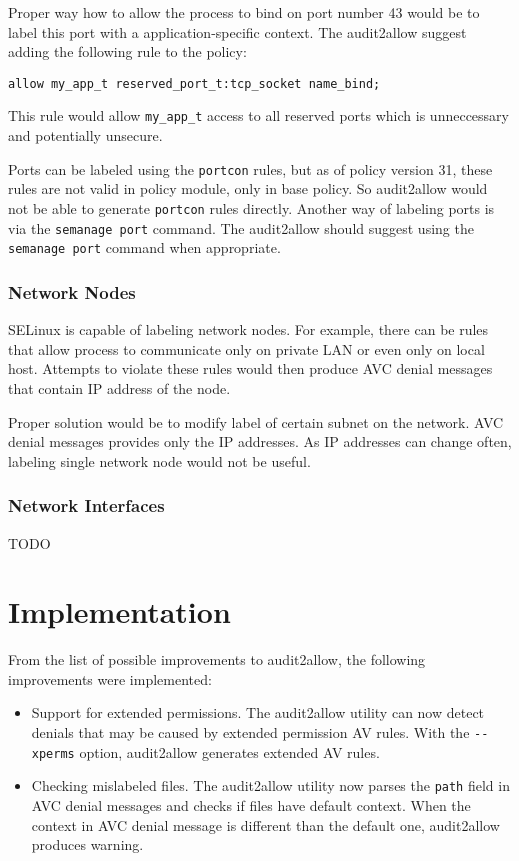 Proper way how to allow the process to bind on port number 43 would be to label
this port with a application-specific context. The audit2allow suggest adding
the following rule to the policy:
\begin{lstlisting}
allow my_app_t reserved_port_t:tcp_socket name_bind;
\end{lstlisting}
This rule would allow \texttt{my\_app\_t} access to all reserved ports which is
unneccessary and potentially unsecure.

Ports can be labeled using the \texttt{portcon} rules, but as of policy version
31, these rules are not valid in policy module, only in base policy. So
audit2allow would not be able to generate \texttt{portcon} rules directly.
Another way of labeling ports is via the \texttt{semanage port} command. The
audit2allow should suggest using the \texttt{semanage port} command when
appropriate.

\subsection{Network Nodes}
SELinux is capable of labeling network nodes. For example, there can be rules
that allow process to communicate only on private LAN or even only on local
host. Attempts to violate these rules would then produce AVC denial messages
that contain IP address of the node.

Proper solution would be to modify label of certain subnet on the network. AVC
denial messages provides only the IP addresses. As IP addresses can change
often, labeling single network node would not be useful.

\subsection{Network Interfaces}
TODO

\chapter{Implementation}
From the list of possible improvements to audit2allow, the following
improvements were implemented:
\begin{itemize}
    \item Support for extended permissions. The audit2allow utility can now
        detect denials that may be caused by extended permission AV rules. With
        the \texttt{-{}-xperms} option, audit2allow generates extended AV rules.
    \item Checking mislabeled files. The audit2allow utility now parses the
        \texttt{path} field in AVC denial messages and checks if files have
        default context. When the context in AVC denial message is different
        than the default one, audit2allow produces warning.
\end{itemize}


